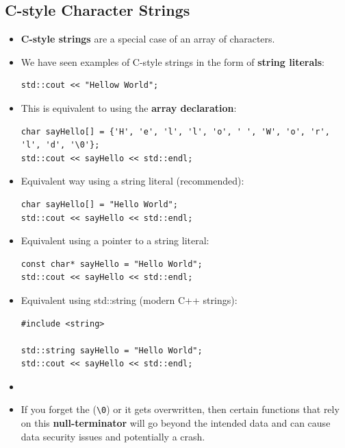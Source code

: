 \documentclass[10pt]{article}
\newcommand{\vocab}[1]{\fbox{\textbf{\textit{#1}}}}
\begin{document}
\subsection{C-style Character Strings}
\begin{itemize}
	\item \textbf{C-style strings} are a special case of an array of characters.

	\item We have seen examples of C-style strings in the form of \textbf{string literals}:
		\begin{verbatim}
std::cout << "Hellow World";
		\end{verbatim}

	\item This is equivalent to using the \textbf{array declaration}:
	\begin{verbatim}
char sayHello[] = {'H', 'e', 'l', 'l', 'o', ' ', 'W', 'o', 'r', 'l', 'd', '\0'};
std::cout << sayHello << std::endl;
	\end{verbatim}

	\item Equivalent way using a string literal (recommended):
\begin{verbatim}
char sayHello[] = "Hello World";
std::cout << sayHello << std::endl;
\end{verbatim}

\item Equivalent using a pointer to a string literal:
\begin{verbatim}
const char* sayHello = "Hello World";
std::cout << sayHello << std::endl;
\end{verbatim}

\item Equivalent using std::string (modern C++ strings):
\begin{verbatim}
#include <string>

std::string sayHello = "Hello World";
std::cout << sayHello << std::endl;
\end{verbatim}

\item {}

\item If you forget the \vocab{null terminator} (\verb|\0|) or it gets overwritten, then certain functions that rely on this \textbf{null-terminator} will go beyond the intended data and can cause data security issues and potentially a crash.


\end{itemize}
\end{document}
